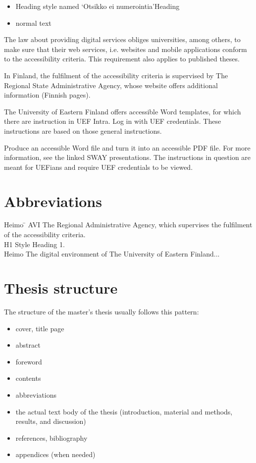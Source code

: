 \documentclass[11pt, a4paper]{report}
\begin{document}
\begin{itemize}
    \item Heading style named ‘Otsikko ei numerointia’Heading 
    \item normal text
\end{itemize}

The law about providing digital services obliges universities, among others, to make sure that their web services, i.e. websites and mobile applications conform to the accessibility criteria. This requirement also applies to published theses.

In Finland, the fulfilment of the accessibility criteria is supervised by The Regional State Administrative Agency, whose website offers additional information (Finnish pages). 

The University of Eastern Finland offers accessible Word templates, for which there are instruction in UEF Intra. Log in with UEF credentials. These instructions are based on those general instructions.

Produce an accessible Word file and turn it into an accessible PDF file. For more information, see the linked SWAY presentations. The instructions in question are meant for UEFians and require UEF credentials to be viewed.



\chapter*{Abbreviations}

\begin{tabbing}
Heimo \qquad \= \kill 
AVI \> The Regional Administrative Agency, which supervises the fulfilment of the accessibility criteria. \\
H1 \> Style Heading 1.\\
Heimo \> The digital environment of The University of Eastern Finland...
\end{tabbing}


\tableofcontents

\chapter{Thesis structure}
The structure of the master’s thesis usually follows this pattern:
\begin{itemize}
    \item cover, title page
    \item abstract
    \item foreword
    \item contents
    \item abbreviations
    \item the actual text body of the thesis (introduction, material and methods, results, and discussion)
    \item references, bibliography
    \item appendices (when needed)

\end{itemize}
\end{document}
